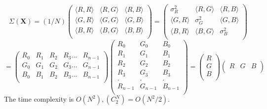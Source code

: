 \begin{compactitem}
\[
\Sigma(\textbf{X})=(1/N)
\begin{pmatrix}
       \langle R, R \rangle	& \langle R, G \rangle 	& \langle R, B	\rangle \\[0.3em]
       \langle G, R \rangle 	& \langle G, G \rangle		& \langle G, B	\rangle \\[0.3em]
       \langle B, R \rangle	& \langle B, G \rangle 	& \langle B, B	\rangle	\\[0.3em]
\end{pmatrix}
=
\begin{pmatrix}
       \sigma_R^2              & \langle R, G \rangle 	&  \langle R, B	\rangle \\[0.3em]
       \langle G, R \rangle 	& \sigma_G^2	            & \langle G, B	\rangle \\[0.3em]
       \langle B, R \rangle	& \langle B, G \rangle 	& \sigma_B^2	\\[0.3em]
\end{pmatrix}
\]
\[
=
\begin{pmatrix}
       R_0 & R_1 & R_2 & R_3 ... & R_{n-1} \\[0.3em]
       G_0 & G_1 & G_2 & G_3 ... & G_{n-1} \\[0.3em]
       B_0 & B_1 & B_2 & B_3 ... & B_{n-1} \\[0.3em]
\end{pmatrix}
\begin{pmatrix}
       R_0     & G_0     & B_0\\[0.3em]
       R_1     & G_1     & B_1\\[0.3em]
       R_2     & G_2     & B_2\\[0.3em]
       R_3     & G_3     & B_3\\[0.3em]
		.      & .       & .  \\[0.3em]
       R_{n-1} & G_{n-1} & B_{n-1}\\[0.3em]
\end{pmatrix}
=
\begin{pmatrix}
       R \\[0.3em]
       G \\[0.3em]
       B \\[0.3em]
\end{pmatrix}
\begin{pmatrix}
       R & G & B\\[0.3em]
\end{pmatrix}
\]
The time complexity is $O(N^2),  (C_2^N) = O(N^2/2)$.
\end{compactitem}

